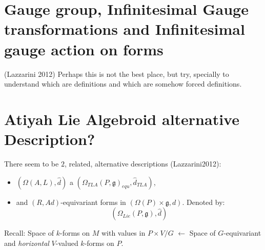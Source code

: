 \section{Gauge group, Infinitesimal Gauge transformations and Infinitesimal gauge action on forms}

(Lazzarini 2012) Perhaps this is not the best place, but try, specially to understand which are definitions and which are somehow forced definitions.

\section{Atiyah Lie Algebroid alternative Description?}

There seem to be $2$, related, alternative descriptions (Lazzarini2012):
    
    \begin{itemize}
        
    \item $(\Omega(A, L), \hat d)$ a $(\Omega_{TLA}(P, \mathfrak g)_{equ}, \hat d_{TLA})$,
    
    \item and $(R, Ad)$-equivariant forms in $(\Omega(P) \times \mathfrak g, d)$. Denoted by: \[ (\Omega_{Lie}(P, \mathfrak g), \hat d) \]
        
    \end{itemize}

Recall: Space of $k$-forms on $M$ with values in $P \times V/G$ $\longleftarrow$ Space of $G$-equivariant and \emph{horizontal} $V$-valued $k$-forms on $P$.
